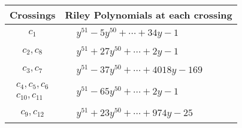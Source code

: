 \documentclass[1p]{elsarticle_modified}
\theoremstyle{definition}
\begin{document}
\begin{tabular}{m{50pt}|m{274pt}}
Crossings & \hspace{64pt}Riley Polynomials at each crossing \\
\hline $$\begin{aligned}c_{1}\end{aligned}$$&$\begin{aligned}
&y^{51}-5 y^{50}+\cdots+34 y-1
\end{aligned}$\\
\hline $$\begin{aligned}c_{2},c_{8}\end{aligned}$$&$\begin{aligned}
&y^{51}+27 y^{50}+\cdots+2 y-1
\end{aligned}$\\
\hline $$\begin{aligned}c_{3},c_{7}\end{aligned}$$&$\begin{aligned}
&y^{51}-37 y^{50}+\cdots+4018 y-169
\end{aligned}$\\
\hline $$\begin{aligned}c_{4},c_{5},c_{6}\\c_{10},c_{11}\end{aligned}$$&$\begin{aligned}
&y^{51}-65 y^{50}+\cdots+2 y-1
\end{aligned}$\\
\hline $$\begin{aligned}c_{9},c_{12}\end{aligned}$$&$\begin{aligned}
&y^{51}+23 y^{50}+\cdots+974 y-25
\end{aligned}$\\
\hline
\end{tabular}
\vskip 2pc
\end{document}
